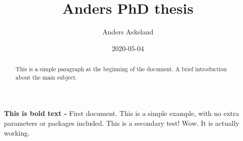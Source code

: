 \documentclass[10pt, twoside, openright]{book} %
\title{Anders PhD thesis}
\author{Anders Askeland}
\date{2020-05-04}
\begin{document}
\maketitle
\begin{abstract} %
This is a simple paragraph at the beginning of the 
document. A brief introduction about the main subject.
\end{abstract}

\textbf{This is bold text - }
First document. This is a simple example, with no 
extra parameters or packages included. This is a secondary test! Wow. It is actually working. 
\end{document}

